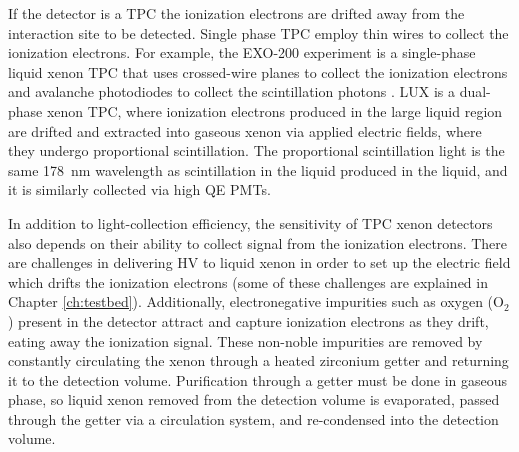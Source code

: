 If the detector is a \ac{TPC} the ionization electrons are drifted away from the interaction site to be detected. Single phase \ac{TPC} employ thin wires to collect the ionization electrons. For example, the EXO-200 experiment is a single-phase liquid xenon \ac{TPC} that uses crossed-wire planes to collect the ionization electrons and avalanche photodiodes to collect the scintillation photons \cite{Auger2012}. \ac{LUX} is a dual-phase xenon \ac{TPC}, where ionization electrons produced in the large liquid region are drifted and extracted into gaseous xenon via applied electric fields, where they undergo proportional scintillation. The proportional scintillation light is the same 178~nm wavelength as scintillation in the liquid produced in the liquid, and it is similarly collected via high \ac{QE} \ac{PMT}s.

In addition to light-collection efficiency, the sensitivity of \ac{TPC} xenon detectors also depends on their ability to collect signal from the ionization electrons. There are challenges in delivering \ac{HV} to liquid xenon in order to set up the electric field which drifts the ionization electrons (some of these challenges are explained in Chapter \ref{ch:testbed}). Additionally, electronegative impurities such as oxygen (O$_{2}$) present in the detector attract and capture ionization electrons as they drift, eating away the ionization signal. These non-noble impurities are removed by constantly circulating the xenon through a heated zirconium getter and returning it to the detection volume. Purification through a getter must be done in gaseous phase, so liquid xenon removed from the detection volume is evaporated, passed through the getter via a circulation system, and re-condensed into the detection volume. 


